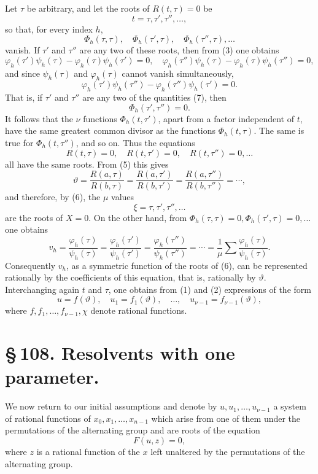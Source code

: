 \documentclass[11pt]{article}
\begin{document}
Let \(\tau\) be arbitrary, and let the roots of \(R(t,\tau)=0\) be
\begin{equation}
t=\tau,\tau',\tau'',\ldots,
\tag{7}
\end{equation}
so that, for every index \(h\),
\[
\Phi_h(\tau,\tau),\quad \Phi_h(\tau',\tau),\quad \Phi_h(\tau'',\tau),\ldots
\]
vanish. If \(\tau'\) and \(\tau''\) are any two of these roots, then from (3) one obtains
\[
\varphi_h(\tau')\psi_h(\tau)-\varphi_h(\tau)\psi_h(\tau')=0,
\quad
\varphi_h(\tau'')\psi_h(\tau)-\varphi_h(\tau)\psi_h(\tau'')=0,
\]
and since \(\psi_h(\tau)\) and \(\varphi_h(\tau)\) cannot vanish simultaneously,
\[
\varphi_h(\tau')\psi_h(\tau'')-\varphi_h(\tau'')\psi_h(\tau')=0.
\]
That is, if \(\tau'\) and \(\tau''\) are any two of the quantities (7), then
\[
\Phi_h(\tau',\tau'')=0.
\]
It follows that the \(\nu\) functions \(\Phi_h(t,\tau')\), apart from a factor independent of \(t\), have the same greatest common divisor as the functions \(\Phi_h(t,\tau)\). The same is true for \(\Phi_h(t,\tau'')\), and so on. Thus the equations
\[
R(t,\tau)=0,\quad R(t,\tau')=0,\quad R(t,\tau'')=0,\ldots
\]
all have the same roots. From (5) this gives
\[
\vartheta=
\frac{R(a,\tau)}{R(b,\tau)}
=
\frac{R(a,\tau')}{R(b,\tau')}
=
\frac{R(a,\tau'')}{R(b,\tau'')}=\cdots,
\]
and therefore, by (6), the \(\mu\) values
\[
\xi=\tau,\tau',\tau'',\ldots
\]
are the roots of \(X=0\). On the other hand, from \(\Phi_h(\tau,\tau)=0,\Phi_h(\tau',\tau)=0,\ldots\) one obtains
\[
v_h=\frac{\varphi_h(\tau)}{\psi_h(\tau)}
=
\frac{\varphi_h(\tau')}{\psi_h(\tau')}
=
\frac{\varphi_h(\tau'')}{\psi_h(\tau'')}
=\cdots
=
\frac1\mu\sum\frac{\varphi_h(\tau)}{\psi_h(\tau)}.
\]
Consequently \(v_h\), as a symmetric function of the roots of (6), can be represented rationally by the coefficients of this equation, that is, rationally by \(\vartheta\). Interchanging again \(t\) and \(\tau\), one obtains from (1) and (2) expressions of the form
\begin{equation}
u=f(\vartheta),\quad
u_1=f_1(\vartheta),\quad\ldots,\quad
u_{\nu-1}=f_{\nu-1}(\vartheta),
\tag{10}
\end{equation}
where \(f,f_1,\ldots,f_{\nu-1},\chi\) denote rational functions.

\section*{\S\,108. Resolvents with one parameter.}

We now return to our initial assumptions and denote by \(u,u_1,\ldots,u_{\nu-1}\) a system of rational functions of \(x_0,x_1,\ldots,x_{n-1}\) which arise from one of them under the permutations of the alternating group and are roots of the equation
\begin{equation}
F(u,z)=0,
\tag{1}
\end{equation}
where \(z\) is a rational function of the \(x\) left unaltered by the permutations of the alternating group.
\end{document}
